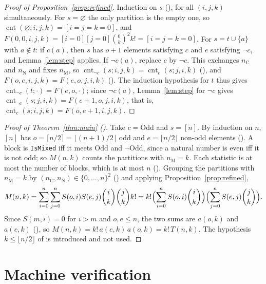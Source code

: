 \documentclass[11pt]{amsart}
\theoremstyle{plain}
\theoremstyle{definition}
\newcommand{\nC}{n_{\mathrm C}}
\newcommand{\nN}{n_{\mathrm N}}
\newcommand{\nM}{n_{\mathrm M}}
\newcommand{\cnt}{\operatorname{cnt}}
\begin{document}
\begin{proof}[Proof of Proposition~\ref{prop:refined}]
Induction on $s$ (), for all $(i,j,k)$ simultaneously.
For $s=\varnothing$ the only partition is the empty one, so $\cnt(\varnothing;i,j,k)=[i=j=k=0]$, and $F(0,0,i,j,k)=[i=0][j=0]\binom 0k^2k!=[i=j=k=0]$.
For $s=t\cup\{a\}$ with $a\notin t$: if $c(a)$, then $s$ has $o+1$ elements satisfying $c$ and $e$ satisfying $\neg c$, and Lemma~\ref{lem:step} applies.
If $\neg c(a)$, replace $c$ by $\neg c$. This exchanges $\nC$ and $\nN$ and fixes $\nM$, so $\cnt_{\neg c}(s;i,j,k)=\cnt_c(s;j,i,k)$ (), and $F(o,e,i,j,k)=F(e,o,j,i,k)$ ().
The induction hypothesis for $t$ thus gives $\cnt_{\neg c}(t;\cdot)=F(e,o,\cdot)$; since $\neg c(a)$, Lemma~\ref{lem:step} for $\neg c$ gives $\cnt_{\neg c}(s;j,i,k)=F(e+1,o,j,i,k)$, that is, $\cnt_c(s;i,j,k)=F(o,e+1,i,j,k)$.
\end{proof}

\begin{proof}[Proof of Theorem~\ref{thm:main} ()]
Take $c=\mathrm{Odd}$ and $s=[n]$. By induction on $n$, $[n]$ has $o=\lceil n/2\rceil=\lfloor(n+1)/2\rfloor$ odd and $e=\lfloor n/2\rfloor$ non-odd elements ().
A block is \texttt{IsMixed} iff it meets $\mathrm{Odd}$ and $\neg\mathrm{Odd}$, since a natural number is even iff it is not odd; so $M(n,k)$ counts the partitions with $\nM=k$.
Each statistic is at most the number of blocks, which is at most $n$ ().
Grouping the partitions with $\nM=k$ by $(\nC,\nN)\in\{0,\dots,n\}^2$ () and applying Proposition~\ref{prop:refined},
\[
  M(n,k)=\sum_{i=0}^{n}\sum_{j=0}^{n}S(o,i)S(e,j)\binom ik\binom jk k!
  =k!\Bigl(\sum_{i=0}^{n}S(o,i)\binom ik\Bigr)\Bigl(\sum_{j=0}^{n}S(e,j)\binom jk\Bigr).
\]
Since $S(m,i)=0$ for $i>m$ and $o,e\le n$, the two sums are $a(o,k)$ and $a(e,k)$ (), so $M(n,k)=k!\,a(e,k)\,a(o,k)=k!\,T(n,k)$.
The hypothesis $k\le\lfloor n/2\rfloor$ of  is introduced and not used.
\end{proof}

\section{Machine verification}\label{sec:lean}
\end{document}
